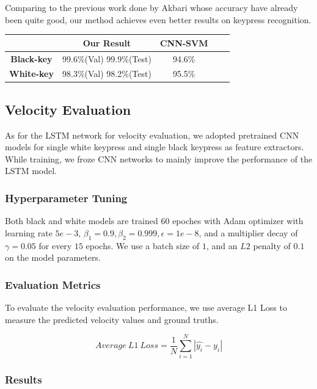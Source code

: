 \documentclass[10pt,twocolumn,letterpaper]{article}
\begin{document}
Comparing to the previous work done by Akbari\cite{Akbari} whose accuracy have already been quite good, our method achieves even better results on keypress recognition.
\\


\begin{minipage}{\linewidth}
   \centering
\begin{tabular}{ccccc}
   \toprule
   & Our Result & CNN-SVM\\
   \midrule
   \textbf{Black-key} &99.6\%(Val) 99.9\%(Test)& 94.6\%\\
   \textbf{White-key} &98.3\%(Val) 98.2\%(Test)& 95.5\%\\
   \bottomrule
   \end{tabular}
    \label{tab:prevdataset}

\end{minipage}

\subsection{Velocity Evaluation}

As for the LSTM network for velocity evaluation, we adopted pretrained CNN models for single white keypress and single black keypress as feature extractors. While training, we froze CNN networks to mainly improve the performance of the LSTM model.

\subsubsection{Hyperparameter Tuning}

Both black and white models are trained \(60\) epoches with Adam optimizer with learning rate \(5e-3\), \(\beta_1 = 0.9, \beta_2 = 0.999, \epsilon = 1e-8\), and a multiplier decay of \(\gamma=0.05\) for every $15$ epochs. We use a batch size of \(1\), and an \(L2\) penalty of \(0.1\) on the model parameters.

\subsubsection{Evaluation Metrics}

To evaluate the velocity evaluation performance, we use average L1 Loss to measure the predicted velocity values and ground truths.

\[Average\ L1\ Loss = \frac{1}{N}\sum_{i=1}^{N}|\widehat{y_i} - y_i|\]

\subsubsection{Results}
\end{document}
